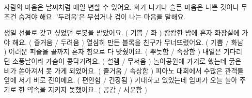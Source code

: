 \documentclass[fs13,seriesSau]{korfarm-base}
\begin{document}
\kfActivityBg \par{}\par\nopagebreak[4]\smallskip\nopagebreak[4]
\begin{kfConnect}
\end{kfConnect}

\kfActivityBg \par{}\par\nopagebreak[4]\smallskip\nopagebreak[4]
\begin{kfOXList}
\kfOXItem 사람의 마음은 날씨처럼 매일 변할 수 있어요. \kfFillBlank[12mm]{} \kfOX
\kfOXItem 화가 나거나 슬픈 마음은 나쁜 것이니 무조건 숨겨야 해요. \kfFillBlank[12mm]{} \kfOX
\kfOXItem '두려움'은 무섭거나 겁이 나는 마음을 말해요. \kfFillBlank[12mm]{} \kfOX
\end{kfOXList}

\kfActivityBg \par{}\par\nopagebreak[4]\smallskip\nopagebreak[4]
\begin{kfBlankList}
\kfBlankItem 생일 선물로 갖고 싶었던 로봇을 받았어요. ( 기쁨 / 화 )
\kfBlankItem 캄캄한 밤에 혼자 화장실에 가야 해요. ( 즐거움 / 두려움 )
\kfBlankItem 열심히 만든 블록을 친구가 무너뜨렸어요. ( 기쁨 / 화남 )
\kfBlankItem 어려운 퍼즐을 끝까지 혼자 힘으로 다 맞췄어요. ( 뿌듯함 / 속상함 )
\kfBlankItem 내일은 기다리던 소풍날이라 가슴이 콩닥거려요. ( 설렘 / 무서움 )
\kfBlankItem 놀이공원에 가기로 했는데 굵은 비가 쏟아져서 못 가게 되었어요. ( 즐거움 / 속상함 )
\kfBlankItem 피아노 대회에서 수많은 관객들 앞에 서기 바로 전이에요. ( 편안함 / 긴장됨 )
\kfBlankItem 기대하고 있었는데 엄마가 오늘 놀아 주기로 한 약속을 지키지 못했어요. ( 공감 / 서운함 )
\end{kfBlankList}




\end{document}
